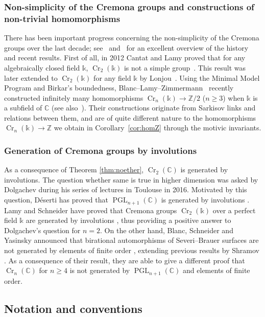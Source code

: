 \documentclass[a4paper,12pt]{amsart}
\def\C{\mathbb C}
\def\k{\mathbb k}
\def\Z{\mathbb Z}
\def\PGL{{\operatorname{PGL}}}
\def\Cr{{\operatorname{Cr}}}
\theoremstyle{plain}
\numberwithin{equation}{section}
\theoremstyle{definition}
\renewcommand{\(}{\left(}
\renewcommand{\)}{\right)}
\begin{document}
\subsubsection{Non-simplicity of the Cremona groups and constructions of non-trivial homomorphisms} 
\hfill

There has been important progress concerning the non-simplicity of the Cremona groups
over the last decade;
see~\cite{Cantat-Cremona} and~\cite[Introduction]{BLZ}
for an excellent overview of the history and recent results.
First of all,
in 2012
Cantat and Lamy proved that 
for any algebraically closed
field $\k$,
$\Cr_2(\k)$ is not a simple group~\cite{MR3037611}.
This result was later extended to $\Cr_2(\k)$ for any field $\k$ by Lonjou~\cite{MR3533276}.
Using the Minimal Model Program and Birkar's boundedness,
Blanc--Lamy--Zimmermann~\cite{BLZ} recently constructed infinitely
many homomorphisms $\Cr_n(\k) \to \Z/2$ ($n \ge 3$) when $\k$ is a subfield of $\C$ (see also~\cite{MR4136435}). 
Their constructions
originate from Sarkisov links and relations between them, and
are of quite different nature to 
the homomorphisms 
$\Cr_n(\k) \to \Z$ we obtain 
in Corollary~\ref{cor:homZ}
through the motivic invariants.

\subsubsection{Generation of Cremona groups
by involutions}
\hfill

As a consequence of Theorem \ref{thm:noether},
$\Cr_2(\C)$ is generated by involutions.
The question whether same is true in higher dimension
was asked by Dolgachev during his series of lectures
in Toulouse in 2016.
Motivated by this question, D\'eserti has proved that $\PGL_{n+1}(\C)$
is generated by involutions \cite[Proposition C]{Deserti}.
Lamy and Schneider have proved
that Cremona groups $\Cr_2(\k)$ over a perfect field $\k$ are generated
by involutions \cite{LamySchneider}, thus providing
a positive answer to Dolgachev's question for $n = 2$.
On the other hand,
Blanc, Schneider and Yasinsky announced 
that birational automorphisms of Severi--Brauer surfaces
are not generated by elements of finite order \cite{BSY},
extending previous results by Shramov \cite{Shramov-SB}.
As a consequence of their result, 
they
are able to give a different proof that $\Cr_n(\C)$
for $n \ge 4$
is not generated by $\PGL_{n+1}(\C)$ and elements of finite order.


\subsection{Notation and conventions}
\label{ss:notation}
\hfill
\end{document}
